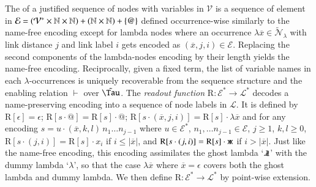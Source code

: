 \documentclass{elsarticle}
\theoremstyle{plain}
\theoremstyle{definition}
\newcommand\VarSet{\mathcal{V}}
\newcommand\Nodes{\mathcal{N}}%
\newcommand{\ghostlmd}{{\lambda\mkern-7mu \lambda}}
\newcommand{\ghostvar}{\mathsf{x\mkern-5mu x}}
\newcommand\ExtendedNodesLmd{\tilde{\Nodes}_{\lambda}}
\def\readout{\mathrm{R}} %
\def\nameencoding{\mathcal{E}} %
\newcommand{\enables}{\vdash} %
\newcommand{\exttree}{\tilde{\Tau}} %
\begin{document}
The  of a justified sequence of nodes with variables in $\VarSet$ is a sequence of element in
$\nameencoding = (\mathcal{V}^*\times\nat\times\nat) +
   (\nat\times\nat)
   + \{ @ \}$  defined occurrence-wise similarly to the name-free encoding
 except for lambda nodes where
  an occurrence $\lambda\overline{x}\in\ExtendedNodesLmd$
 with link distance $j$ and link label $i$ gets encoded
 as $(\overline{x},j,i) \in \mathcal{E}$.
%
Replacing the second components of the lambda-nodes encoding by their length
yields the name-free encoding.
Reciprocally, given a fixed term, the list of variable names in each $\lambda$-occurrences is uniquely recoverable from the sequence structure and the enabling relation $\enables$ over $\exttree$.
%
%
The \emph{readout function} $\readout: \nameencoding^* \rightarrow \mathcal{L}^*$
decodes a name-preserving encoding into a sequence of node labels in $\mathcal{L}$. It is defined by
$\readout[\epsilon]= \epsilon$;
$\readout[s \cdot @] = \readout[s] \cdot @$;
$\readout[s \cdot (\overline{x}, j, i) ] = \readout[s] \cdot \lambda\overline{x}$
and for any encoding $s = u \cdot (\overline{x}, k, l)\,  n_1 \ldots n_{j-1}$ where $u \in \nameencoding^*$, $n_1, \ldots n_{j-1}\in \nameencoding$, $j\geq 1$, $k,l\geq 0$,
$\readout[s\cdot (j,i)] = \readout[s] \cdot x_i$
if $i\leq |\overline{x}|$, and
$\readout[s\cdot (j,i)]  = \readout[s] \cdot \ghostvar$ if $i> |\overline{x}|$.
Just like the name-free encoding, this encoding assimilates the ghost lambda `$\ghostlmd$' with the dummy lambda `$\lambda$', so that the case $\lambda\overline{x}$ where $\overline{x}=\epsilon$ covers both the ghost lambda and dummy lambda.
%
We then define $\readout \colon \nameencoding^* \rightarrow \mathcal{L}^*$
by point-wise extension.
\end{document}
